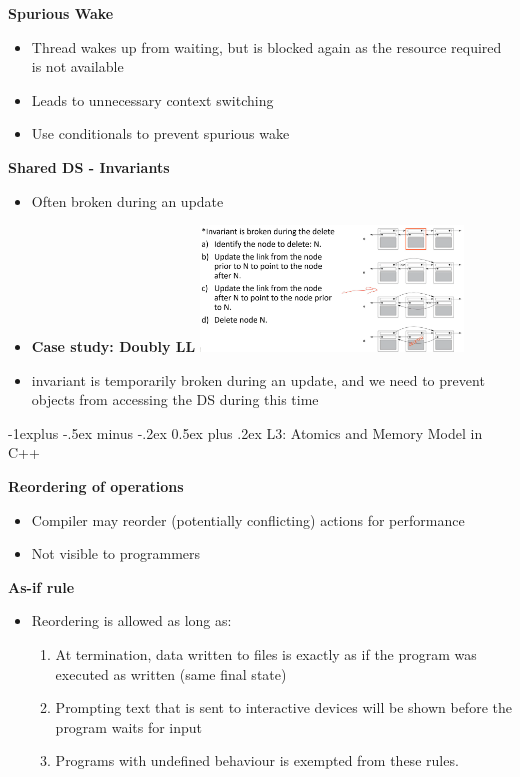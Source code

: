 \documentclass[10pt, landscape]{article}
\makeatletter
\renewcommand{\subsection}{\@startsection{subsection}{2}{0mm}%
                                {-1explus -.5ex minus -.2ex}%
                                {0.5ex plus .2ex}%
                                {\normalfont\normalsize\bfseries}}
\makeatother
\begin{document}
\begin{multicols}{4}
\begin{itemize}
\textbf{Spurious Wake} \\ 
\begin{itemize}
    \item Thread wakes up from waiting, but is blocked again as the resource required is not available
    \item Leads to unnecessary context switching
    \item Use conditionals to prevent spurious wake
\end{itemize}

\end{itemize}

\textbf{Shared DS - Invariants} \\ 
\begin{itemize}
    \item Often broken during an update 
    \item \textbf{Case study: Doubly LL}
\includegraphics*[width=7cm, width=7cm]{dll.png}
    \item  invariant is temporarily broken during an update, and we need to prevent objects from accessing the DS during this time
\end{itemize}

\subsection{L3: Atomics and Memory Model in C++} 

\textbf{Reordering of operations} \\ 
\begin{itemize}
    \item Compiler may reorder (potentially conflicting) actions for performance 
    \item Not visible to programmers
\end{itemize}

\textbf{As-if rule} \\
\begin{itemize}
    \item Reordering is allowed as long as:
    \begin{enumerate}
        \item At termination, data written to files is exactly as if the program was executed as written (same final state)
        \item Prompting text that is sent to interactive devices will be shown before the program waits for input
        \item Programs with undefined behaviour is exempted from these rules.
    \end{enumerate}
\end{itemize}


\end{multicols}
\end{document}
